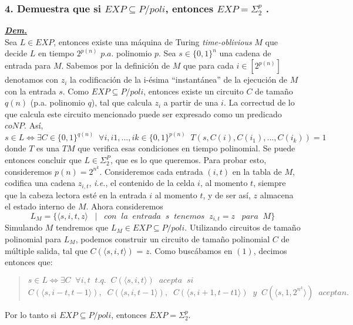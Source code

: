 \documentclass[12pt]{article}
\begin{document}
\subsubsection*{4. Demuestra que si $EXP \subseteq P/poli$, entonces $EXP = \Sigma^p_2$ .}
\underline{\textbf{\textit{Dem.}}}\\
Sea $L \in EXP$, entonces existe una máquina de Turing \textit{time-oblivious} $M$ que decide $L$ en tiempo $2^{p(n)}$ $p.a.$ polinomio $p$. Sea $s \in \{0,1\}^n$ una cadena de entrada para $M$. Sabemos por la definición de $M$ que para cada $i \in [2^{p(n)}]$ denotamos con $z_i$ la codificación de
la i-ésima ``instantánea'' de la ejecución de $M$ con la entrada $s$.
Como $EXP \subseteq P/poli$, entonces existe un circuito $C$ de tamaño $q(n)$ (p.a. polinomio $q$), tal que calcula $z_i$ a partir de una $i$.
La correctud de lo que calcula este circuito mencionado puede ser expresado como un predicado $coNP$. Así, \\
\begin{equation}
  s \in L \iff \exists C \in \{0,1\}^{q(n)}\;\; \forall i,i1,...,ik \in \{0,1\}^{p(n)}\;\; T(s,C(i),C(i_1),...,C(i_k)) = 1
\end{equation}
donde $T$ es una $TM$ que verifica esas condiciones en tiempo polinomial. Se puede entonces concluir que $L \in \Sigma^P_2$, que es lo que queremos.
Para probar esto, consideremos $p(n) = 2^{n^k}$. Consideremos cada entrada $(i,t)$ en la tabla de $M$, codifica una cadena $z_{i,t}$, \textit{i.e.}, el contenido
de la celda $i$, al momento $t$, siempre que la cabeza lectora esté en la entrada $i$ al momento $t$, y de ser así, $z$ almacena el estado interno
de $M$. Ahora consideremos
\begin{equation}
  L_M = \{\langle s, i, t, z\rangle \;\;\;|\;\;\; con\;\;la\;\;entrada\;\;s\;\;tenemos\;\; z_{i,t} = z \;\;\;para\;\; M \}
\end{equation}
Simulando $M$ tendremos que $L_M \in EXP \subseteq P/poli$. Utilizando
circuitos de tamaño polinomial para $L_M$, podemos construir un circuito
 de tamaño polinomial $C$  de múltiple salida, tal que $C(\langle s,i,t\rangle)$ = $z$. Como buscábamos en $(1)$, decimos entonces que:\\
\begin{quote}
$  s \in L \iff \exists C\;\; \forall i,t\;\; t.q.\;\; C(\langle s,i,t\rangle)\;\; acepta\;\;
si$\\
$C(\langle s,i-t,t-1\rangle),\;\;C(\langle s,i,t-1\rangle),\;\;C(\langle s,i+1,t-t1\rangle)\;\; y\;\; C(\langle s,1,2^{n^k}\rangle)\;\; aceptan.$
\end{quote}
Por lo tanto si $EXP \subseteq P/poli$, entonces $EXP = \Sigma^p_2$.
\end{document}
